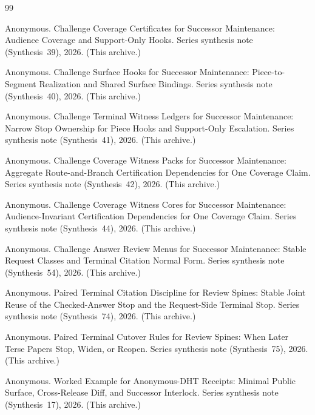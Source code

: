 \documentclass[11pt]{article}
\begin{document}
\begin{thebibliography}{99}\small

Anonymous.
\newblock Challenge Coverage Certificates for Successor Maintenance: Audience Coverage and Support-Only Hooks.
\newblock Series synthesis note (Synthesis~39), 2026. (This archive.)

Anonymous.
\newblock Challenge Surface Hooks for Successor Maintenance: Piece-to-Segment Realization and Shared Surface Bindings.
\newblock Series synthesis note (Synthesis~40), 2026. (This archive.)

Anonymous.
\newblock Challenge Terminal Witness Ledgers for Successor Maintenance: Narrow Stop Ownership for Piece Hooks and Support-Only Escalation.
\newblock Series synthesis note (Synthesis~41), 2026. (This archive.)

Anonymous.
\newblock Challenge Coverage Witness Packs for Successor Maintenance: Aggregate Route-and-Branch Certification Dependencies for One Coverage Claim.
\newblock Series synthesis note (Synthesis~42), 2026. (This archive.)

Anonymous.
\newblock Challenge Coverage Witness Cores for Successor Maintenance: Audience-Invariant Certification Dependencies for One Coverage Claim.
\newblock Series synthesis note (Synthesis~44), 2026. (This archive.)

Anonymous.
\newblock Challenge Answer Review Menus for Successor Maintenance: Stable Request Classes and Terminal Citation Normal Form.
\newblock Series synthesis note (Synthesis~54), 2026. (This archive.)

Anonymous.
\newblock Paired Terminal Citation Discipline for Review Spines: Stable Joint Reuse of the Checked-Answer Stop and the Request-Side Terminal Stop.
\newblock Series synthesis note (Synthesis~74), 2026. (This archive.)

Anonymous.
\newblock Paired Terminal Cutover Rules for Review Spines: When Later Terse Papers Stop, Widen, or Reopen.
\newblock Series synthesis note (Synthesis~75), 2026. (This archive.)

Anonymous.
\newblock Worked Example for Anonymous-DHT Receipts: Minimal Public Surface, Cross-Release Diff, and Successor Interlock.
\newblock Series synthesis note (Synthesis~17), 2026. (This archive.)

\end{thebibliography}
\end{document}
